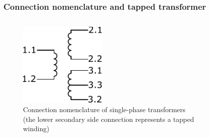 \begin{frame}
	\frametitle{Connection nomenclature and tapped transformer}
	\begin{columns}[b]
		\begin{column}{0.45\textwidth}
			\begin{figure}
				\includegraphics[width=0.45\textwidth]{fig/lec04/Connection_nomenclature_single_phase_transformer.pdf}
				\vspace{1cm}
				\caption{Connection nomenclature of single-phase transformers (the lower secondary side connection represents a tapped winding)}
				\label{fig:Connection_nomenclature_single_phase_transformer}
			\end{figure}
		\end{column}
        \hfill \pause
		\begin{column}{0.55\textwidth}
			\begin{figure}

\end{figure}
\end{column}
\end{columns}
\end{frame}
